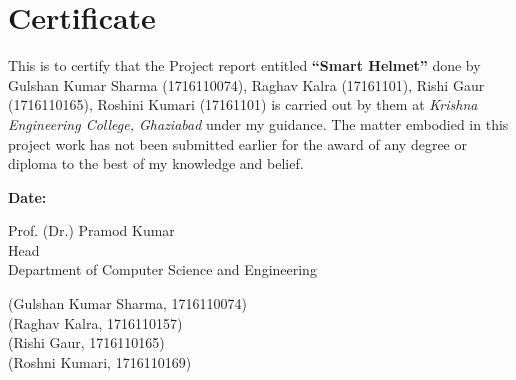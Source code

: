 \chapter*{Certificate}

This is to certify that the Project report entitled \textbf{“Smart Helmet”} done by Gulshan Kumar Sharma (1716110074), Raghav Kalra (17161101), Rishi Gaur (1716110165), Roshini Kumari (17161101) is carried out by them at \textit{Krishna Engineering College, Ghaziabad} under my guidance. The matter embodied in this project work has not been submitted earlier for the award of any degree or diploma to the best of my knowledge and belief.

\vspace{1.5cm}

\textbf{Date:}
\vspace{2cm}

\begin{minipage}[right]{.4\linewidth}
	\begin{flushleft}
		Prof. (Dr.) Pramod Kumar\\ Head\\Department of Computer Science and Engineering
	\end{flushleft}
\end{minipage}
\begin{minipage}[left]{.5\linewidth}
	\begin{center}
		(Gulshan Kumar Sharma, 1716110074)\\
		(Raghav Kalra, 1716110157)\\
		(Rishi Gaur, 1716110165)\\
		(Roshni Kumari, 1716110169)
		
	\end{center}
	
\end{minipage}